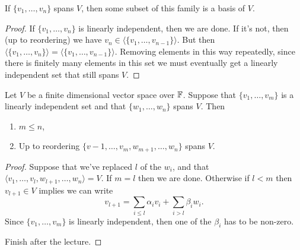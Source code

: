 \documentclass[a4paper]{scrartcl}
\begin{document}
\begin{lemma}
If $\{v_1, \dots, v_n\}$ spans $V$, then some subset of this family is a basis of $V$. 
\end{lemma}
\begin{proof}
    If $\{v_1, \dots, v_n\}$ is linearly independent, then we are done. If it's not, then (up to reordering) we have $v_n \in \langle\{v_1, \dots, v_{n - 1}\}\rangle$. But then $\langle\{v_1, \dots, v_n\}\rangle = \langle\{v_1, \dots, v_{n - 1}\}\rangle$. Removing elements in this way repeatedly, since there is finitely many elements in this set we must eventually get a linearly independent set that still spans $V$.
\end{proof}

\begin{theorem}
    Let $V$ be a finite dimensional vector space over $\mathbb{F}$. Suppose that $\{v_1, \dots, v_m\}$ is a linearly independent set and that $\{w_1, \dots, w_n\}$ spans $V$. Then
    \begin{enumerate}[label=(\roman*)]
        \item $m \leq n$,
        \item Up to reordering $\{v-1, \dots, v_m, w_{m + 1}, \dots, w_n\}$ spans $V$.
    \end{enumerate}
\end{theorem}
\begin{proof}
    Suppose that we've replaced $l$ of the $w_i$,
    and that $\langle v_1, \dots, v_l, w_{l + 1}, \dots, w_n\rangle = V$. If $m = l$ then we are done. Otherwise if $l < m$ then $v_{l + 1} \in V$ implies we can write
    $$
    v_{l + 1} = \sum_{i \leq l} \alpha_i v_i + \sum_{i > l} \beta_i w_i.
    $$
    Since $\{v_1, \dots, v_m\}$ is linearly independent, then one of the $\beta_i$ has to be non-zero. 
    
    Finish after the lecture.
\end{proof}
\end{document}
